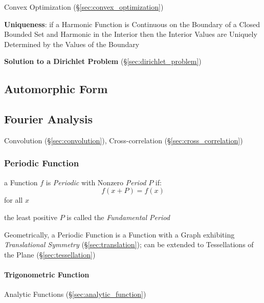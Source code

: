 Convex Optimization (\S\ref{sec:convex_optimization})


\textbf{Uniqueness}: if a Harmonic Function is Continuous on the
Boundary of a Closed Bounded Set and Harmonic in the Interior then the
Interior Values are Uniquely Determined by the Values of the Boundary


\textbf{Solution to a Dirichlet Problem}
(\S\ref{sec:dirichlet_problem})



\subsection{Automorphic Form}\label{sec:automorphic_form}

\subsection{Fourier Analysis}\label{sec:fourier_analysis}

\fist Convolution (\S\ref{sec:convolution}), Cross-correlation
(\S\ref{sec:cross_correlation})



\subsubsection{Periodic Function}\label{sec:periodic_function}

a Function $f$ is \emph{Periodic} with Nonzero \emph{Period} $P$ if:
\[
  f(x+P) = f(x)
\]
for all $x$

the least positive $P$ is called the \emph{Fundamental Period}

Geometrically, a Periodic Function is a Function with a Graph exhibiting
\emph{Translational Symmetry} (\S\ref{sec:translation});
can be extended to Tessellations of the Plane (\S\ref{sec:tessellation})



\paragraph{Trigonometric Function}\label{sec:trigonometric_function}\hfill

Analytic Functions (\S\ref{sec:analytic_function})

